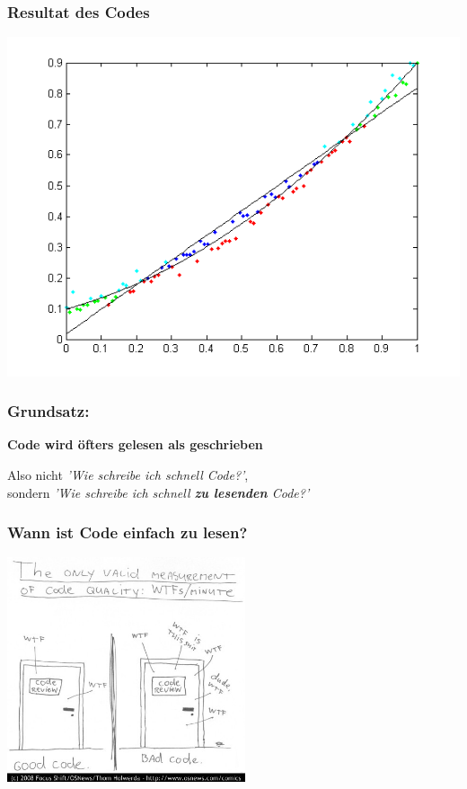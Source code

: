 \documentclass{beamer}
\begin{document}
\begin{frame}
    \frametitle{Resultat des Codes}
    \begin{center}
        \includegraphics[width=0.8\linewidth]{GrafikResultat.png}
    \end{center}
\end{frame}


\begin{frame}
    \frametitle{Grundsatz:}
    \begin{center}
        \huge \bf Code wird öfters gelesen als geschrieben
    \end{center}
    \vspace{2em}\pause
    Also nicht \textit{'Wie schreibe ich schnell Code?'}, \\
    sondern \textit{'Wie schreibe ich schnell \textbf{zu lesenden} Code?'}
\end{frame}

\begin{frame}
    \frametitle{Wann ist Code einfach zu lesen?}
    \begin{center}
        \includegraphics[width=7cm]{wtfm.jpg}
    \end{center}
\end{frame}
\end{document}
